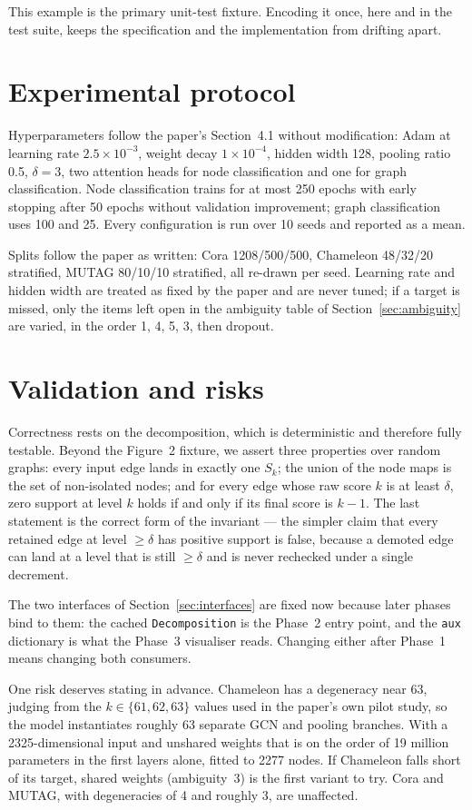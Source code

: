 \documentclass[11pt,a4paper]{article}
\begin{document}
This example is the primary unit-test fixture. Encoding it once, here and in the test suite, keeps
the specification and the implementation from drifting apart.

\section{Experimental protocol}

Hyperparameters follow the paper's Section~4.1 without modification: Adam at learning rate
$2.5\times10^{-3}$, weight decay $1\times10^{-4}$, hidden width 128, pooling ratio 0.5, $\delta = 3$,
two attention heads for node classification and one for graph classification. Node classification
trains for at most 250 epochs with early stopping after 50 epochs without validation improvement;
graph classification uses 100 and 25. Every configuration is run over 10 seeds and reported as a
mean.

Splits follow the paper as written: Cora 1208/500/500, Chameleon 48/32/20 stratified, MUTAG
80/10/10 stratified, all re-drawn per seed. Learning rate and hidden width are treated as fixed by
the paper and are never tuned; if a target is missed, only the items left open in the
ambiguity table of Section~\ref{sec:ambiguity} are varied, in the order 1, 4, 5, 3, then dropout.

\section{Validation and risks}
\label{sec:hooks}

Correctness rests on the decomposition, which is deterministic and therefore fully testable. Beyond
the Figure~2 fixture, we assert three properties over random graphs: every input edge lands in
exactly one $S_k$; the union of the node maps is the set of non-isolated nodes; and for every edge
whose raw score $k$ is at least $\delta$, zero support at level $k$ holds if and only if its final
score is $k-1$. The last statement is the correct form of the invariant --- the simpler claim that
every retained edge at level $\geq \delta$ has positive support is false, because a demoted edge can
land at a level that is still $\geq \delta$ and is never rechecked under a single decrement.

The two interfaces of Section~\ref{sec:interfaces} are fixed now because later phases bind to them:
the cached \texttt{Decomposition} is the Phase~2 entry point, and the \texttt{aux} dictionary is what
the Phase~3 visualiser reads. Changing either after Phase~1 means changing both consumers.

One risk deserves stating in advance. Chameleon has a degeneracy near 63, judging from the $k \in
\{61, 62, 63\}$ values used in the paper's own pilot study, so the model instantiates roughly 63
separate GCN and pooling branches. With a 2325-dimensional input and unshared weights that is on the
order of 19 million parameters in the first layers alone, fitted to 2277 nodes. If Chameleon falls
short of its target, shared weights (ambiguity~3) is the first variant to try. Cora and MUTAG, with
degeneracies of 4 and roughly 3, are unaffected.
\end{document}
